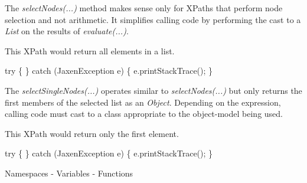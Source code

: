 \documentclass[20pt,landscape,headrule,footrule]{foils}
\begin{document}


The \emph{selectNodes(...)} method makes sense only for
XPaths that perform node selection and not arithmetic.  It simplifies
calling code by performing the cast to a \emph{List} on the results
of \emph{evaluate(...)}.

This XPath would return all  elements in a list.


\begin{codelisting}
try
\{
\}
catch (JaxenException e)
\{
    e.printStackTrace();
\}
\end{codelisting}



The \emph{selectSingleNodes(...)} operates similar to
\emph{selectNodes(...)} but only returns the first members
of the selected list as an \emph{Object}.  Depending on the
expression, calling code must cast to a class appropriate to
the object-model being used.

This XPath would return only the first  element.


\begin{codelisting}
try
\{
\}
catch (JaxenException e)
\{
    e.printStackTrace();
\}
\end{codelisting}



\begin{center}
Namespaces - Variables - Functions
\end{center}
\end{document}
